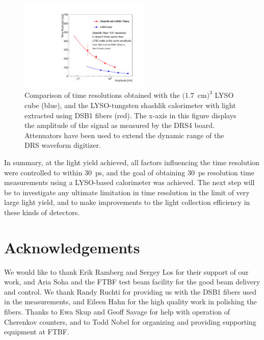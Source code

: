 \documentclass[12pt]{article}
\begin{document}
\begin{figure}[H] \centering
\includegraphics[width=0.55\textwidth]{figs/TimeResolutionVsEnergy_ShashlikDSB1FiberAndCube} 
\caption{Comparison of time resolutions obtained with the $(1.7$~cm$)^{3}$ LYSO cube (blue), and the LYSO-tungsten shashlik calorimeter with light extracted using DSB1 fibers (red). The x-axis in this figure displays the amplitude of the signal as measured by the DRS4 board. Attenuators
 have been used to extend the dynamic range of the DRS waveform digitizer. }
\label{fig:ShashlikFiberAndCubeTOF}
\end{figure}

In summary, at the light yield achieved, all factors influencing the time
resolution were controlled to within $30$~ps, and the goal of obtaining $30$~ps
resolution time measurements using a LYSO-based calorimeter was achieved. The
next step will be to investigate any ultimate limitation in time resolution in
the limit of very large light yield, and to make improvements to the light
collection efficiency in these kinds of detectors.

\section{Acknowledgements} We would like to thank Erik Ramberg and Sergey Los
for their support of our work, and Aria Soha and the FTBF test beam facility for
the good beam delivery and control. We thank Randy Ruchti for providing us with
the DSB1 fibers used in the measurements, and Eileen Hahn for the high quality
work in polishing the fibers. Thanks to Ewa Skup and Geoff Savage for help with
operation of Cherenkov counters, and to Todd Nobel for organizing and providing
supporting equipment at FTBF.


{}

\end{document}
